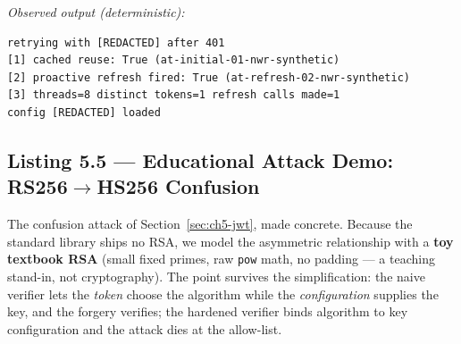 \noindent\emph{Observed output (deterministic):}
\begin{verbatim}
retrying with [REDACTED] after 401
[1] cached reuse: True (at-initial-01-nwr-synthetic)
[2] proactive refresh fired: True (at-refresh-02-nwr-synthetic)
[3] threads=8 distinct tokens=1 refresh calls made=1
config [REDACTED] loaded
\end{verbatim}

\subsection{Listing 5.5 --- Educational Attack Demo: RS256\texorpdfstring{$\rightarrow$}{->}HS256 Confusion}
\label{lst:algconfusion}

The confusion attack of Section~\ref{sec:ch5-jwt}, made concrete. Because
the standard library ships no RSA, we model the asymmetric relationship with
a \textbf{toy textbook RSA} (small fixed primes, raw \texttt{pow} math, no
padding --- a teaching stand-in, not cryptography). The point survives the
simplification: the naive verifier lets the \emph{token} choose the
algorithm while the \emph{configuration} supplies the key, and the forgery
verifies; the hardened verifier binds algorithm to key configuration and the
attack dies at the allow-list.

